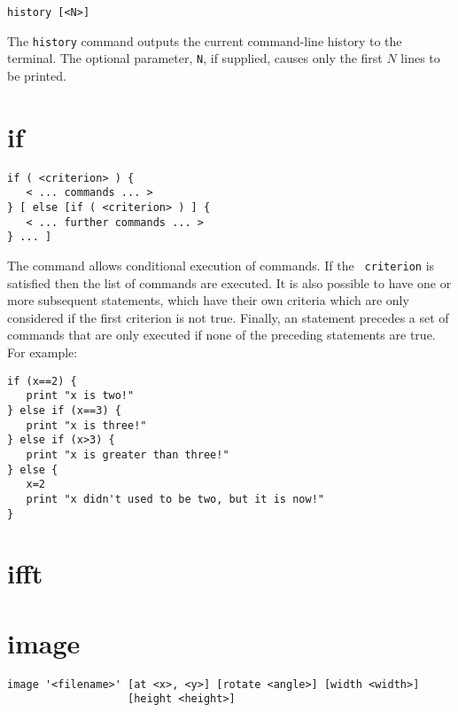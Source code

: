 \begin{verbatim}
history [<N>]
\end{verbatim}

The {\tt history} command outputs the current command-line history to the
terminal.  The optional parameter, {\tt N}, if supplied, causes only the first
$N$ lines to be printed.


\section{if}

\begin{verbatim}
if ( <criterion> ) {
   < ... commands ... >
} [ else [if ( <criterion> ) ] {
   < ... further commands ... >
} ... ]
\end{verbatim}

The  command allows conditional execution of commands.  If the {\tt
criterion} is satisfied then the list of commands are executed.  It is also
possible to have one or more subsequent  statements, which have
their own criteria which are only considered if the first criterion is not true.
Finally, an  statement precedes a set of commands that are only
executed if none of the preceding statements are true.  For example:

\begin{verbatim}
if (x==2) {
   print "x is two!"
} else if (x==3) {
   print "x is three!"
} else if (x>3) {
   print "x is greater than three!"
} else {
   x=2
   print "x didn't used to be two, but it is now!"
}
\end{verbatim}


\section{ifft}


\section{image}

\begin{verbatim}
image '<filename>' [at <x>, <y>] [rotate <angle>] [width <width>]
                   [height <height>]
\end{verbatim}

